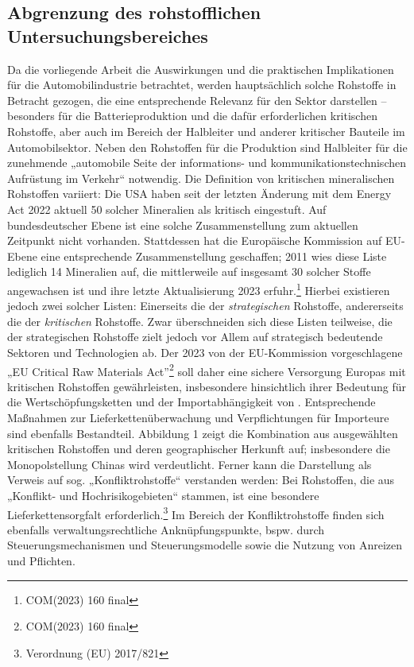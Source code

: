 \documentclass[12pt,a4paper,oneside]{book} %
\begin{document}
\subsection{Abgrenzung des rohstofflichen Untersuchungsbereiches}
Da die vorliegende Arbeit die Auswirkungen und die praktischen Implikationen für die Automobilindustrie betrachtet, werden hauptsächlich solche Rohstoffe in Betracht gezogen, die eine entsprechende Relevanz für den Sektor darstellen – besonders für die Batterieproduktion und die dafür erforderlichen kritischen Rohstoffe, aber auch im Bereich der Halbleiter und anderer kritischer Bauteile im Automobilsektor. Neben den Rohstoffen für die Produktion sind Halbleiter für die zunehmende „automobile Seite der informations- und kommunikationstechnischen Aufrüstung im Verkehr“\autocite[26f.]{schelewsky_vulnerabilitat_2017} notwendig. Die Definition von kritischen mineralischen Rohstoffen variiert: Die USA haben seit der letzten Änderung mit dem Energy Act 2022 aktuell 50 solcher Mineralien als kritisch eingestuft.\autocite{u_s_geological_survey_final_2022} Auf bundesdeutscher Ebene ist eine solche Zusammenstellung zum aktuellen Zeitpunkt nicht vorhanden. Stattdessen hat die Europäische Kommission auf EU-Ebene eine entsprechende Zusammenstellung geschaffen; 2011 wies diese Liste lediglich 14 Mineralien auf, die mittlerweile auf insgesamt 30 solcher Stoffe angewachsen ist und ihre letzte Aktualisierung 2023 erfuhr.\footnote{COM(2023) 160 final} Hierbei existieren jedoch zwei solcher Listen: Einerseits die der \textit{strategischen} Rohstoffe, andererseits die der \textit{kritischen} Rohstoffe.\autocite[vgl. auch]{falke_neue_2023} Zwar überschneiden sich diese Listen teilweise, die der strategischen Rohstoffe zielt jedoch vor Allem auf strategisch bedeutende Sektoren und Technologien ab. 
Der 2023 von der EU-Kommission vorgeschlagene „EU Critical Raw Materials Act”\footnote{COM(2023) 160 final} soll daher eine sichere Versorgung Europas mit kritischen Rohstoffen gewährleisten, insbesondere hinsichtlich ihrer Bedeutung für die Wertschöpfungsketten und der Importabhängigkeit von . Entsprechende Maßnahmen zur Lieferkettenüberwachung und Verpflichtungen für Importeure sind ebenfalls Bestandteil. Abbildung 1 zeigt die Kombination aus ausgewählten kritischen Rohstoffen und deren geographischer Herkunft auf; insbesondere die Monopolstellung Chinas wird verdeutlicht. Ferner kann die Darstellung als Verweis auf sog. „Konfliktrohstoffe“ verstanden werden: Bei Rohstoffen, die aus „Konflikt- und Hochrisikogebieten“ stammen, ist eine besondere Lieferkettensorgfalt erforderlich.\footnote{Verordnung (EU) 2017/821} Im Bereich der Konfliktrohstoffe finden sich ebenfalls verwaltungsrechtliche Anknüpfungspunkte, bspw. durch Steuerungsmechanismen und Steuerungsmodelle sowie die Nutzung von Anreizen und Pflichten.\autocite[ausführlich am Beispiel der USA]{nowrot_rohstoffhandel_2016}
\end{document}

